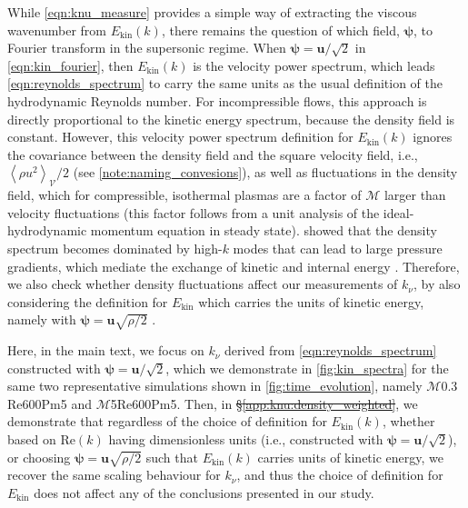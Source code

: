 \documentclass[12pt,twoside]{extreport}
\makeatletter
\newcommand{\mAve}[1]{\left\langle #1 \right\rangle} %
\newcommand{\mVector}[1]{\bm{#1}} %
\newcommand{\mReh}{\ensuremath{\mathrm{Re}}} %
\newcommand{\mPrm}{\ensuremath{\mathrm{Pm}}} %
\newcommand{\mSonicMach}{\ensuremath{\mathcal{M}}} %
\newcommand{\mVolume}{\ensuremath{\mathcal{V}}} %
\newcommand{\ie}{i.e.,\xspace} %
\newcommand{\SimName}[3]{$\mSonicMach${#1}$\mReh${#2}$\mPrm${#3}}
\providecommand{\DIFaddtex}[1]{{\protect\color{DIFgreen}\uwave{#1}}} %
\providecommand{\DIFdeltex}[1]{{\protect\color{DIFpurple}\sout{#1}}} %
\providecommand{\DIFaddbegin}{} %
\providecommand{\DIFaddend}{} %
\providecommand{\DIFdelbegin}{} %
\providecommand{\DIFdelend}{} %
\providecommand{\DIFadd}[1]{\texorpdfstring{\DIFaddtex{#1}}{#1}} %
\providecommand{\DIFdel}[1]{\texorpdfstring{\DIFdeltex{#1}}{}} %
\providecommand{\DIFscaledelfig}{0.5}
\newlength{\DIFdelgraphicswidth} %
\newlength{\DIFdelgraphicsheight} %
\providecommand{\DIFaddincludegraphics}[2][]{{\color{DIFgreen}\fbox{\DIFOincludegraphics[#1]{#2}}}} %
\providecommand{\DIFdelincludegraphics}[2][]{%
\sbox{\DIFdelgraphicsbox}{\DIFOincludegraphics[#1]{#2}}%
\settoboxwidth{\DIFdelgraphicswidth}{\DIFdelgraphicsbox} %
\settoboxtotalheight{\DIFdelgraphicsheight}{\DIFdelgraphicsbox} %
\scalebox{\DIFscaledelfig}{%
\parbox[b]{\DIFdelgraphicswidth}{\usebox{\DIFdelgraphicsbox}\\[-\baselineskip] \rule{\DIFdelgraphicswidth}{0em}}\llap{\resizebox{\DIFdelgraphicswidth}{\DIFdelgraphicsheight}{%
\setlength{\unitlength}{\DIFdelgraphicswidth}%
\begin{picture}(1,1)%
\thicklines\linethickness{2pt} %
{\color{DIFpurple}\put(0,0){\framebox(1,1){}}}%
{\color{DIFpurple}\put(0,0){\line( 1,1){1}}}%
{\color{DIFpurple}\put(0,1){\line(1,-1){1}}}%
\end{picture}%
}\hspace*{3pt}}} %
} %
\DeclareRobustCommand{\DIFaddbegin}{\DIFOaddbegin \let\includegraphics\DIFaddincludegraphics} %
\DeclareRobustCommand{\DIFaddend}{\DIFOaddend \let\includegraphics\DIFOincludegraphics} %
\DeclareRobustCommand{\DIFdelbegin}{\DIFOdelbegin \let\includegraphics\DIFdelincludegraphics} %
\DeclareRobustCommand{\DIFdelend}{\DIFOaddend \let\includegraphics\DIFOincludegraphics} %
\let\sout@orig\sout %
\renewcommand{\sout}[1]{\ifmmode\text{\sout@orig{\ensuremath{#1}}}\else\sout@orig{#1}\fi} %
\makeatother
\begin{document}
While \autoref{eqn:knu_measure} provides a simple way of extracting the viscous wavenumber from $E_\mathrm{kin}(k)$, there remains the question of which field, $\mVector{\psi}$, to Fourier transform in the supersonic regime. When $\mVector{\psi} = \mVector{u}/\sqrt{2}$ in \autoref{eqn:kin_fourier}, then $E_\mathrm{kin}(k)$ is the velocity power spectrum, which leads \autoref{eqn:reynolds_spectrum} to carry the same units as the usual definition of the hydrodynamic Reynolds number. For incompressible flows, this approach is directly proportional to the kinetic energy spectrum, because the density field is constant. However, this velocity power spectrum definition for $E_\mathrm{kin}(k)$ ignores the covariance between the density field and the square velocity field, \ie $\mAve{\rho u^2}_\mVolume / 2$ (see \autoref{note:naming_convesions}), as well as fluctuations in the density field, which for compressible, isothermal plasmas are a factor of $\mSonicMach$ larger than velocity fluctuations (this factor follows from a unit analysis of the ideal-hydrodynamic momentum equation in steady state). \citet{beattie2020filaments} showed that the density spectrum becomes dominated by high-$k$ modes that can lead to large pressure gradients, which mediate the exchange of kinetic and internal energy \citep[see for example][]{federrath2010comparing, federrath2013universality, schmidt2019kinetic, grete2021matter, grete2023matter}. Therefore, we also check whether density fluctuations affect our measurements of $k_\nu$, by also considering the definition for $E_\mathrm{kin}$ which carries the units of kinetic energy, namely with $\mVector{\psi} = \mVector{u} \sqrt{\rho/2}$ \citep[see, e.g., ][]{federrath2010comparing, grete2021matter, grete2023matter}.

Here, in the main text, we focus on $k_\nu$ derived from \autoref{eqn:reynolds_spectrum} constructed with $\mVector{\psi} = \mVector{u}/\sqrt{2}$, which we demonstrate in \autoref{fig:kin_spectra} for the same two representative simulations shown in \autoref{fig:time_evolution}, namely \SimName{0.3}{600}{5} and \SimName{5}{600}{5}. Then, in \DIFdelbegin \DIFdel{\S\ref{app:knu:density_weighted}}\DIFdelend \DIFaddbegin \DIFadd{End Matter (\S\ref{app:knu:density_weighted})}\DIFaddend , we demonstrate that regardless of the choice of definition for $E_\mathrm{kin}(k)$, whether based on $\mReh(k)$ having dimensionless units (\ie constructed with $\mVector{\psi} = \mVector{u} / \sqrt{2}$), or choosing $\mVector{\psi} = \mVector{u} \sqrt{\rho/2}$ such that $E_\mathrm{kin}(k)$ carries units of kinetic energy, we recover the same scaling behaviour for $k_\nu$, and thus the choice of definition for $E_\mathrm{kin}$ does not affect any of the conclusions presented in our study.
\end{document}
